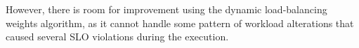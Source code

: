 However, there is room for improvement using the dynamic load-balancing weights algorithm, as it cannot handle some pattern of workload alterations that caused several SLO violations during the execution.





